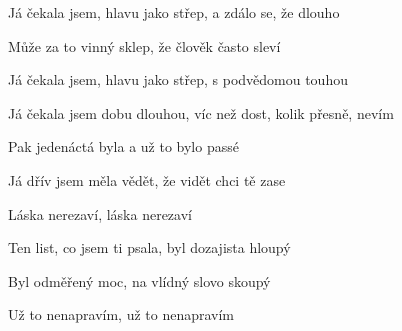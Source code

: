 \begin{song}
Já čekala jsem, hlavu jako střep, a zdálo se, že dlouho \par
{}Může za to vinný sklep, že člověk  často sleví \par
Já čekala jsem, hlavu jako střep,  s podvědomou touhou \par
Já čekala jsem dobu dlouhou, víc než dost, kolik přesně, nevím \par

\bigskip

Pak jedenáctá byla a už to bylo passé \par
Já dřív jsem měla vědět, že vidět chci tě zase \par
{}Láska nerezaví, láska nerezaví \par

\bigskip

Ten list, co jsem ti psala, byl dozajista hloupý \par
Byl odměřený moc, na vlídný slovo skoupý \par
{}Už to nenapravím, už to nenapravím \par

\bigskip

\Refren \par
{}

\end{song}